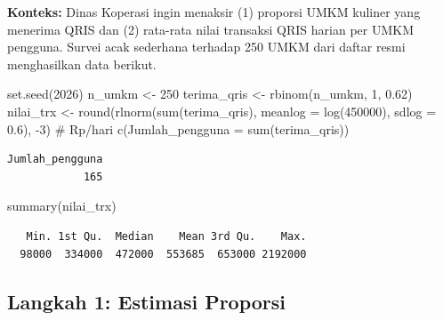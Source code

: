 \documentclass[
  indonesian,
  letterpaper,
]{book}
\newenvironment{Shaded}{\begin{snugshade}}{\end{snugshade}}
\newcommand{\AttributeTok}[1]{\textcolor[rgb]{0.40,0.45,0.13}{#1}}
\newcommand{\CommentTok}[1]{\textcolor[rgb]{0.37,0.37,0.37}{#1}}
\newcommand{\DecValTok}[1]{\textcolor[rgb]{0.68,0.00,0.00}{#1}}
\newcommand{\FloatTok}[1]{\textcolor[rgb]{0.68,0.00,0.00}{#1}}
\newcommand{\FunctionTok}[1]{\textcolor[rgb]{0.28,0.35,0.67}{#1}}
\newcommand{\NormalTok}[1]{\textcolor[rgb]{0.00,0.23,0.31}{#1}}
\newcommand{\OtherTok}[1]{\textcolor[rgb]{0.00,0.23,0.31}{#1}}
\newcommand{\SpecialCharTok}[1]{\textcolor[rgb]{0.37,0.37,0.37}{#1}}
\begin{document}
\textbf{Konteks:} Dinas Koperasi ingin menaksir (1) proporsi UMKM
kuliner yang menerima QRIS dan (2) rata-rata nilai transaksi QRIS harian
per UMKM pengguna. Survei acak sederhana terhadap 250 UMKM dari daftar
resmi menghasilkan data berikut.

\begin{Shaded}
\begin{Highlighting}[]
\FunctionTok{set.seed}\NormalTok{(}\DecValTok{2026}\NormalTok{)}
\NormalTok{n\_umkm }\OtherTok{\textless{}{-}} \DecValTok{250}
\NormalTok{terima\_qris }\OtherTok{\textless{}{-}} \FunctionTok{rbinom}\NormalTok{(n\_umkm, }\DecValTok{1}\NormalTok{, }\FloatTok{0.62}\NormalTok{)}
\NormalTok{nilai\_trx }\OtherTok{\textless{}{-}} \FunctionTok{round}\NormalTok{(}\FunctionTok{rlnorm}\NormalTok{(}\FunctionTok{sum}\NormalTok{(terima\_qris), }\AttributeTok{meanlog =} \FunctionTok{log}\NormalTok{(}\DecValTok{450000}\NormalTok{), }\AttributeTok{sdlog =} \FloatTok{0.6}\NormalTok{), }\SpecialCharTok{{-}}\DecValTok{3}\NormalTok{)  }\CommentTok{\# Rp/hari}
\FunctionTok{c}\NormalTok{(}\AttributeTok{Jumlah\_pengguna =} \FunctionTok{sum}\NormalTok{(terima\_qris))}
\end{Highlighting}
\end{Shaded}

\begin{verbatim}
Jumlah_pengguna 
            165 
\end{verbatim}

\begin{Shaded}
\begin{Highlighting}[]
\FunctionTok{summary}\NormalTok{(nilai\_trx)}
\end{Highlighting}
\end{Shaded}

\begin{verbatim}
   Min. 1st Qu.  Median    Mean 3rd Qu.    Max. 
  98000  334000  472000  553685  653000 2192000 
\end{verbatim}

\subsection{Langkah 1: Estimasi
Proporsi}\label{langkah-1-estimasi-proporsi}
\end{document}
